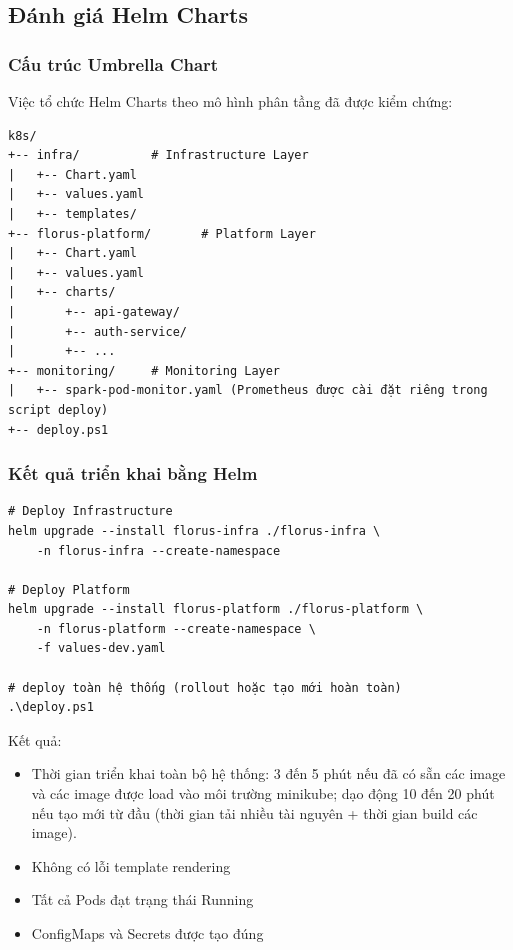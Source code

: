 

\subsection{Đánh giá Helm Charts}

\subsubsection{Cấu trúc Umbrella Chart}

Việc tổ chức Helm Charts theo mô hình phân tầng đã được kiểm chứng:

\begin{lstlisting}[caption={Cấu trúc Helm Charts}]
k8s/
+-- infra/          # Infrastructure Layer
|   +-- Chart.yaml
|   +-- values.yaml
|   +-- templates/
+-- florus-platform/       # Platform Layer
|   +-- Chart.yaml
|   +-- values.yaml
|   +-- charts/
|       +-- api-gateway/
|       +-- auth-service/
|       +-- ...
+-- monitoring/     # Monitoring Layer
|   +-- spark-pod-monitor.yaml (Prometheus được cài đặt riêng trong script deploy)
+-- deploy.ps1
\end{lstlisting}

\subsubsection{Kết quả triển khai bằng Helm}

\begin{lstlisting}[caption={Lệnh triển khai Helm}]
# Deploy Infrastructure
helm upgrade --install florus-infra ./florus-infra \
    -n florus-infra --create-namespace

# Deploy Platform
helm upgrade --install florus-platform ./florus-platform \
    -n florus-platform --create-namespace \
    -f values-dev.yaml

# deploy toàn hệ thống (rollout hoặc tạo mới hoàn toàn)
.\deploy.ps1 
\end{lstlisting}

Kết quả:
\begin{itemize}
    \item Thời gian triển khai toàn bộ hệ thống: 3 đến 5 phút nếu đã có sẵn các image và các image được load vào môi trường minikube; dạo động 10 đến 20 phút nếu tạo mới từ đầu (thời gian tải nhiều tài nguyên + thời gian build các image).
    \item Không có lỗi template rendering
    \item Tất cả Pods đạt trạng thái Running
    \item ConfigMaps và Secrets được tạo đúng
\end{itemize}

